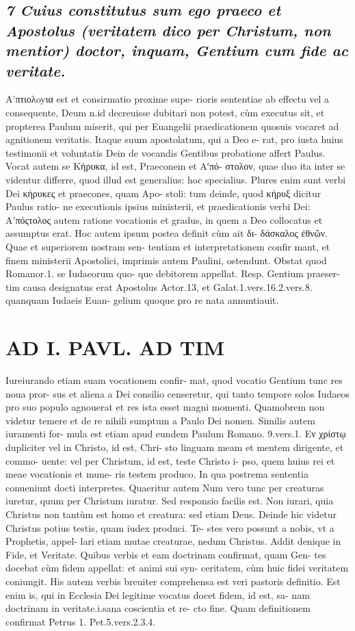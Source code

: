 \documentclass{article}
\begin{document}
\begin{pages}
\subsection*{\textit{7 Cuius constitutus sum ego praeco et Apostolus (veritatem dico per Christum, non mentior) doctor, inquam, Gentium cum fide ac veritate. }}\pstart Α’πτιολoyια est et consirmatio proxime supe- rioris sententiae ab effectu vel a consequente, Deum n.id decreuisse dubitari non potest, cùm executus sit, et propterea Paulum miserit, qui per Euangelii praedicationem quosuis vocaret ad agnitionem veritatis. Itaque suum apostolatum, qui a Deo e- rat, pro iusta huius testimonii et voluntatis Dein de vocandis Gentibus probatione affert Paulus. Vocat autem se Κήρυκα, id est, Praeconem et Aʹπό- στολον, quae duo ita inter se videntur differre, quod illud est generalius: hoc specialius. Plures enim sunt verbi Dei κήρυκες et praecones, quam Apo- stoli: tum deinde, quod κήρυξ dicitur Paulus ratio- ne executionis ipsius ministerii, et praedicationis verbi Dei: Α’πόςτολος autem ratione vocationis et gradus, in quem a Deo collocatus et assumptus erat. Hoc autem ipsum postea definit cùm ait δι- δάσκαλος ἐθνῶν. Quae et superiorem nostram sen- tentiam et interpretationem confir mant, et finem ministerii Apostolici, imprimis autem Paulini, ostendunt.  \pend\pstart Obstat quod Romanor.1. se Iudaeorum quo- que debitorem appellat. Resp. Gentium praeser- tim causa designatus erat Apostolus Actor.13, et Galat.1.vers.16.2.vers.8. quanquam Iudaeis Euan- gelium quoque pro re nata annuntiauit.  \pend
\section*{AD I. PAVL. AD TIM }
\marginpar{[ p.64 ]}\pstart Iureiurando etiam suam vocationem confir- mat, quod vocatio Gentium tunc res noua pror- sus et aliena a Dei consilio censeretur, qui tanto tempore solos Iudaeos pro suo populo agnouerat et res ista esset magni momenti. Quamobrem non videtur temere et de re nihili sumptum a Paulo Dei nomen. Similis autem iuramenti for- mula est etiam apud eundem Paulum Romano. 9.vers.1.  \pend\pstart Εν χρίστῳ dupliciter vel in Christo, id est, Chri- sto linguam meam et mentem dirigente, et commo- uente: vel per Christum, id est, teste Christo i- pso, quem huius rei et meae vocationis et mune- ris testem produco. In qua postrema sententia conueniunt docti interpretes. Quaeritur autem Num vero tunc per creaturas iuretur, quum per Christum iuratur. Sed responsio facilis est. Non iurari, quia Christus non tantùm est homo et creatura: sed etiam Deus. Deinde hic videtur Christus potius testis, quam iudex produci. Te- stes vero possunt a nobis, vt a Prophetis, appel- lari etiam mutae creaturae, nedum Christus.  \pend\pstart Addit denique in Fide, et Veritate. Quibus verbis et eam doctrinam confirmat, quam Gen- tes docebat cùm fidem appellat: et animi sui syn- ceritatem, cùm huic fidei veritatem coniungit. His autem verbis breuiter comprehensa est veri pastoris definitio. Est enim is, qui in Ecclesia Dei legitime vocatus docet fidem, id est, sa- nam doctrinam in veritate.i.sana coscientia et re- cto fine. Quam definitionem confirmat Petrus 1. Pet.5.vers.2.3.4.  \pend

\end{pages}
\end{document}
